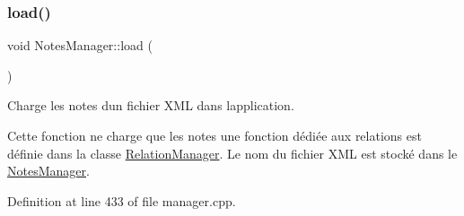 \subsubsection{\texorpdfstring{load()}{load()}}
{\footnotesize\ttfamily void Notes\+Manager\+::load (\begin{DoxyParamCaption}{ }\end{DoxyParamCaption})}



Charge les notes d\textquotesingle{}un fichier X\+ML dans l\textquotesingle{}application. 

Cette fonction ne charge que les notes une fonction dédiée aux relations est définie dans la classe \hyperlink{class_relation_manager}{Relation\+Manager}. Le nom du fichier X\+ML est stocké dans le \hyperlink{class_notes_manager}{Notes\+Manager}. 

Definition at line 433 of file manager.\+cpp.

